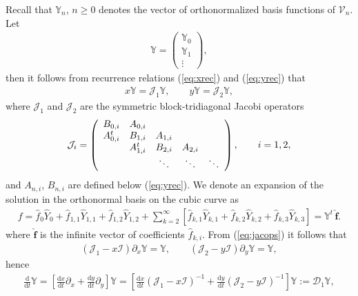 \documentclass{amsart}
\theoremstyle{remark}
\newcommand{\wh}{\widehat}
\begin{document}
Recall that $\mathbb{Y}_n$, $n \geq 0$ denotes the vector of orthonormalized basis functions of $\mathcal{V}_n$. Let
\begin{align*}
\mathbb{Y} = \left(
\begin{array}{c}
\mathbb{Y}_0\\
\mathbb{Y}_1 \\
\vdots
\end{array}
\right),
\end{align*}
then it follows from recurrence relations (\ref{eq:xrec}) and (\ref{eq:yrec}) that
\begin{align}
x\mathbb{Y} = \mathcal{J}_1 \mathbb{Y}, \qquad 
y\mathbb{Y} = \mathcal{J}_2 \mathbb{Y},\label{eq:jacops}
\end{align}
where $\mathcal{J}_1$ and $\mathcal{J}_2$ are the symmetric block-tridiagonal Jacobi operators
\begin{align*}
\mathcal{J}_{i} = \left( 
\begin{array}{c c c c c} 
 B_{0,i}                          & A_{0,i}   &         &     &         \\
A_{0,i}^{t}  & B_{1,i}   & A_{1,i} &     &         \\
&A_{1,i}^{t} & B_{2,i}   & A_{2,i} &       \\
 & & \ddots &\ddots & \ddots
\end{array}
\right), \qquad
i = 1, 2,
\end{align*}
and $A_{n,i}$, $B_{n,i}$ are defined below (\ref{eq:yrec}). We denote an expansion of the solution in the orthonormal basis on the cubic curve as
\begin{align*}
f = \wh f_0 \wh Y_0 + \wh f_{1,1} \wh Y_{1,1} + \wh f_{1,2} \wh Y_{1,2} + \sum_{k = 2}^{\infty}\left[ \wh f_{k,1} \wh Y_{k,1} + \wh f_{k,2} \wh Y_{k,2} +  \wh f_{k,3} \wh Y_{k,3}  \right] = \mathbb{Y}^{t}\,\widehat{\mathbf{f}}.
\end{align*} 
where $\widehat{\mathbf{f}}$ is the infinite vector of coefficients $\wh f_{k,i}$. From (\ref{eq:jacops}) it follows that
\begin{align*}
\left( \mathcal{J}_1 - x\mathcal{I}  \right)\partial_x \mathbb{Y} = \mathbb{Y}, \qquad  \left( \mathcal{J}_2 - y\mathcal{I}  \right)\partial_y \mathbb{Y} = \mathbb{Y},
\end{align*}
hence
\begin{align*}
\frac{\mathrm{d}}{\mathrm{d}t}\mathbb{Y} = \left[\frac{\mathrm{d}x}{\mathrm{d}t} \partial_x  + \frac{\mathrm{d}y}{\mathrm{d}t} \partial_y\right] \mathbb{Y} = \left[\frac{\mathrm{d}x}{\mathrm{d}t} \left( \mathcal{J}_1 - x\mathcal{I}  \right)^{-1}  + \frac{\mathrm{d}y}{\mathrm{d}t}\left( \mathcal{J}_2 - y\mathcal{I}  \right)^{-1}\right] \mathbb{Y} := \mathcal{D}_1\mathbb{Y},
\end{align*}
\end{document}
